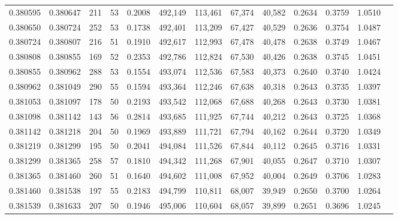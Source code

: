 \begin{tabular}{rrrrrrrrrrrrr}
0.380595 & 0.380647 &   211 &  53 &                                     0.2008 & 492,149 & 113,461 &  67,374 &  40,582 & 0.2634 & 0.3759 & 1.0510 \\
0.380650 & 0.380724 &   252 &  53 &                                     0.1738 & 492,401 & 113,209 &  67,427 &  40,529 & 0.2636 & 0.3754 & 1.0487 \\
0.380724 & 0.380807 &   216 &  51 &                                     0.1910 & 492,617 & 112,993 &  67,478 &  40,478 & 0.2638 & 0.3749 & 1.0467 \\
0.380808 & 0.380855 &   169 &  52 &                                     0.2353 & 492,786 & 112,824 &  67,530 &  40,426 & 0.2638 & 0.3745 & 1.0451 \\
0.380855 & 0.380962 &   288 &  53 &                                     0.1554 & 493,074 & 112,536 &  67,583 &  40,373 & 0.2640 & 0.3740 & 1.0424 \\
0.380962 & 0.381049 &   290 &  55 &                                     0.1594 & 493,364 & 112,246 &  67,638 &  40,318 & 0.2643 & 0.3735 & 1.0397 \\
0.381053 & 0.381097 &   178 &  50 &                                     0.2193 & 493,542 & 112,068 &  67,688 &  40,268 & 0.2643 & 0.3730 & 1.0381 \\
0.381098 & 0.381142 &   143 &  56 &                                     0.2814 & 493,685 & 111,925 &  67,744 &  40,212 & 0.2643 & 0.3725 & 1.0368 \\
0.381142 & 0.381218 &   204 &  50 &                                     0.1969 & 493,889 & 111,721 &  67,794 &  40,162 & 0.2644 & 0.3720 & 1.0349 \\
0.381219 & 0.381299 &   195 &  50 &                                     0.2041 & 494,084 & 111,526 &  67,844 &  40,112 & 0.2645 & 0.3716 & 1.0331 \\
0.381299 & 0.381365 &   258 &  57 &                                     0.1810 & 494,342 & 111,268 &  67,901 &  40,055 & 0.2647 & 0.3710 & 1.0307 \\
0.381365 & 0.381460 &   260 &  51 &                                     0.1640 & 494,602 & 111,008 &  67,952 &  40,004 & 0.2649 & 0.3706 & 1.0283 \\
0.381460 & 0.381538 &   197 &  55 &                                     0.2183 & 494,799 & 110,811 &  68,007 &  39,949 & 0.2650 & 0.3700 & 1.0264 \\
0.381539 & 0.381633 &   207 &  50 &                                     0.1946 & 495,006 & 110,604 &  68,057 &  39,899 & 0.2651 & 0.3696 & 1.0245 \\

\end{tabular}
